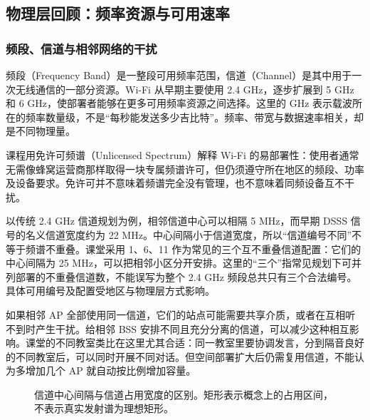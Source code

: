 \subsection{物理层回顾：频率资源与可用速率}

\subsubsection{频段、信道与相邻网络的干扰}

频段（Frequency Band）是一整段可用频率范围，信道（Channel）是其中用于一次无线通信的一部分资源。Wi-Fi 从早期主要使用 2.4 GHz，逐步扩展到 5 GHz 和 6 GHz，使部署者能够在更多可用频率资源之间选择。这里的 GHz 表示载波所在的频率数量级，不是“每秒能发送多少吉比特”。频率、带宽与数据速率相关，却是不同物理量。

课程用免许可频谱（Unlicensed Spectrum）解释 Wi-Fi 的易部署性：使用者通常无需像蜂窝运营商那样取得一块专属频谱许可，但仍须遵守所在地区的频段、功率及设备要求。免许可并不意味着频谱完全没有管理，也不意味着同频设备互不干扰。

以传统 2.4 GHz 信道规划为例，相邻信道中心可以相隔 5 MHz，而早期 DSSS 信号的名义信道宽度约为 22 MHz。中心间隔小于信道宽度，所以“信道编号不同”不等于频谱不重叠。课堂采用 1、6、11 作为常见的三个互不重叠信道配置：它们的中心间隔为 25 MHz，可以把相邻小区分开安排。这里的“三个”指常见规划下可并列部署的不重叠信道数，不能误写为整个 2.4 GHz 频段总共只有三个合法编号。具体可用编号及配置受地区与物理层方式影响。

如果相邻 AP 全部使用同一信道，它们的站点可能需要共享介质，或者在互相听不到时产生干扰。给相邻 BSS 安排不同且充分分离的信道，可以减少这种相互影响。课堂的不同教室类比在这里尤其合适：同一教室里要协调发言，分到隔音良好的不同教室后，可以同时开展不同对话。但空间部署扩大后仍需复用信道，不能认为多增加几个 AP 就自动按比例增加容量。

\begin{figure}[htbp]
\centering
{}
\caption{信道中心间隔与信道占用宽度的区别。矩形表示概念上的占用区间，不表示真实发射谱为理想矩形。}
\end{figure}

